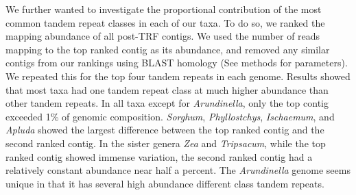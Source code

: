 \documentclass[10pt,letterpaper]{article}
\begin{document}
We further wanted to investigate the proportional contribution of the most common tandem repeat classes in each of our taxa.
To do so, we ranked the mapping abundance of all post-TRF contigs.
We used the number of reads mapping to the top ranked contig as its abundance, and removed any similar contigs from our rankings using BLAST homology (See methods for parameters).
We repeated this for the top four tandem repeats in each genome.
Results showed that most taxa had one tandem repeat class at much higher abundance than other tandem repeats.
In all taxa except for \emph{Arundinella}, only the top contig exceeded 1\% of genomic composition.
\emph{Sorghum}, \emph{Phyllostchys}, \emph{Ischaemum}, and \emph{Apluda} showed the largest difference between the top ranked contig and the second ranked contig.
In the sister genera \emph{Zea} and \emph{Tripsacum}, while the top ranked contig showed immense variation, the second ranked contig had a relatively constant abundance near half a percent.
The \emph{Arundinella} genome seems unique in that it has several high abundance different class tandem repeats.
\end{document}
